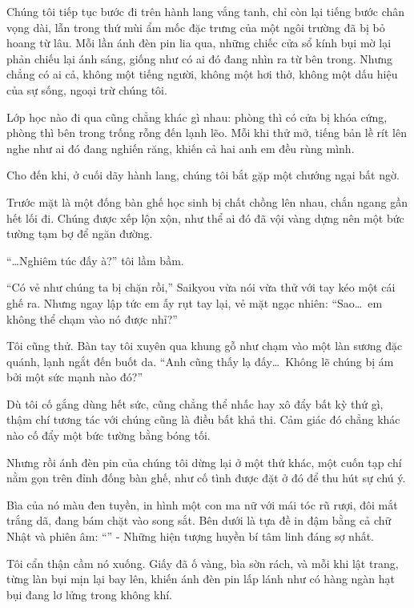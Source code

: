 \documentclass[../main.tex]{subfiles}
\begin{document}
Chúng tôi tiếp tục bước đi trên hành lang vắng tanh, chỉ còn lại tiếng bước chân vọng dài, lẫn trong thứ mùi ẩm mốc đặc trưng của một ngôi trường đã bị bỏ hoang từ lâu. Mỗi lần ánh đèn pin lia qua, những chiếc cửa sổ kính bụi mờ lại phản chiếu lại ánh sáng, giống như có ai đó đang nhìn ra từ bên trong. Nhưng chẳng có ai cả, không một tiếng người, không một hơi thở, không một dấu hiệu của sự sống, ngoại trừ chúng tôi.

Lớp học nào đi qua cũng chẳng khác gì nhau: phòng thì có cửa bị khóa cứng, phòng thì bên trong trống rỗng đến lạnh lẽo. Mỗi khi thử mở, tiếng bản lề rít lên nghe như ai đó đang nghiến răng, khiến cả hai anh em đều rùng mình.

Cho đến khi, ở cuối dãy hành lang, chúng tôi bắt gặp một chướng ngại bất ngờ.

Trước mặt là một đống bàn ghế học sinh bị chất chồng lên nhau, chắn ngang gần hết lối đi. Chúng được xếp lộn xộn, như thể ai đó đã vội vàng dựng nên một bức tường tạm bợ để ngăn đường.


``\dots Nghiêm túc đấy à?'' tôi lầm bầm.

``Có vẻ như chúng ta bị chặn rồi,'' Saikyou vừa nói vừa thử với tay kéo một cái ghế ra. Nhưng ngay lập tức em ấy rụt tay lại, vẻ mặt ngạc nhiên: ``Sao\dots\ em không thể chạm vào nó được nhỉ?''

Tôi cũng thử. Bàn tay tôi xuyên qua khung gỗ như chạm vào một làn sương đặc quánh, lạnh ngắt đến buốt da. ``Anh cũng thấy lạ đấy\dots\ Không lẽ chúng bị ám bởi một sức mạnh nào đó?''

Dù tôi cố gắng dùng hết sức, cũng chẳng thể nhấc hay xô đẩy bất kỳ thứ gì, thậm chí tương tác với chúng cũng là điều bất khả thi. Cảm giác đó chẳng khác nào cố đẩy một bức tường bằng bóng tối.

Nhưng rồi ánh đèn pin của chúng tôi dừng lại ở một thứ khác, một cuốn tạp chí nằm gọn trên đỉnh đống bàn ghế, như cố tình được đặt ở đó để thu hút sự chú ý.

Bìa của nó màu đen tuyền, in hình một con ma nữ với mái tóc rũ rượi, đôi mắt trắng dã, đang bám chặt vào song sắt. Bên dưới là tựa đề in đậm bằng cả chữ Nhật và phiên âm: ``'' - Những hiện tượng huyền bí tâm linh đáng sợ nhất.

Tôi cẩn thận cầm nó xuống. Giấy đã ố vàng, bìa sờn rách, và mỗi khi lật trang, từng làn bụi mịn lại bay lên, khiến ánh đèn pin lấp lánh như có hàng ngàn hạt bụi đang lơ lửng trong không khí.
\end{document}
